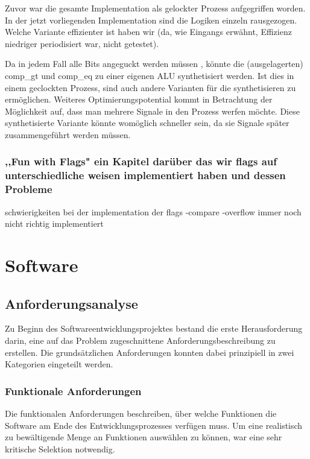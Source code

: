 \documentclass[paper=a4,fontsize=12pt,twocolumn]{scrreprt}
\begin{document}
Zuvor war die gesamte Implementation als gelockter Prozess aufgegriffen worden. In der jetzt vorliegenden Implementation sind die Logiken einzeln rausgezogen. Welche Variante effizienter ist haben wir (da, wie Eingangs erwähnt, Effizienz niedriger periodisiert war, nicht getestet).

Da in jedem Fall alle Bits angeguckt werden müssen , könnte die (ausgelagerten) comp\_gt und comp\_eq zu einer eigenen ALU synthetisiert werden. Ist dies in einem geclockten Prozess, sind auch andere Varianten für die synthetisieren zu ermöglichen.
Weiteres Optimierungspotential kommt in Betrachtung der Möglichkeit auf, dass man mehrere Signale in den Prozess werfen möchte. Diese synthetisierte Variante könnte womöglich schneller sein, da sie Signale später zusammengeführt werden müssen.

\subsection{,,Fun with Flags" ein Kapitel darüber das wir flags auf unterschiedliche weisen implementiert haben und dessen Probleme}

schwierigkeiten bei der implementation der flags
-compare
-overflow immer noch nicht richtig implementiert


\chapter{Software}
\section{Anforderungsanalyse}
Zu Beginn des Softwareentwicklungsprojektes bestand die erste Herausforderung darin, eine auf das Problem zugeschnittene Anforderungsbeschreibung zu erstellen.
Die grundsätzlichen Anforderungen konnten dabei prinzipiell in zwei Kategorien eingeteilt werden.

\subsection{Funktionale Anforderungen}


Die funktionalen Anforderungen beschreiben, über welche Funktionen die Software am Ende des Entwicklungsprozesses verfügen muss.
Um eine realistisch zu bewältigende Menge an Funktionen auswählen zu können, war eine sehr kritische Selektion notwendig. 
\end{document}
